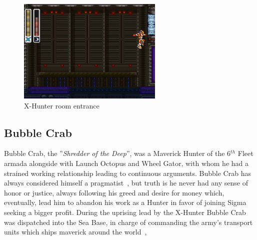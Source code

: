 \begin{figure}[htp]
	\centering
	\includegraphics[height=5cm]{figures/X2/Bubble_crab/Crab_Hunter_room.png}
	\caption{X-Hunter room entrance}
\end{figure}

\subsection{Bubble Crab}\label{boss:Bubble_crab}
Bubble Crab, the ''\textit{Shredder of the Deep}'', was a Maverick Hunter of the 6$^{th}$ Fleet armada alongside with Launch Octopus and Wheel Gator, with whom he had a strained working relationship leading to continuous arguments. Bubble Crab has always considered himself a pragmatist~\cite{Xcoll1:Manual_X2}, but truth is he never had any sense of honor or justice, always following his greed and desire for money which, eventually, lead him to abandon his work as a Hunter in favor of joining Sigma seeking a bigger profit. During the uprising lead by the X-Hunter Bubble Crab was dispatched into the Sea Base, in charge of commanding the army's transport units which ships maverick around the world~\cite{wiki:Bubble_Crab}, \cite{wayback:X2_resources}

